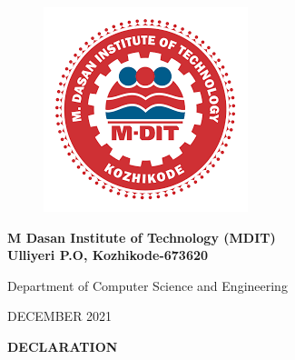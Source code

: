 \documentclass[12pt]{article}
\begin{document}
\begin{changemargin}{0.5cm}{0.5cm}
\begin{figure}[H]
\begin{center}
\includegraphics[scale=.5]{MDIT}
\end{center} 
\end{figure}
\vspace{0.001cm}
\thispagestyle{empty}
\begin{center}\large \bf{M Dasan Institute of Technology (MDIT) \\
Ulliyeri P.O, Kozhikode-673620} \end{center}
\vspace*{0.001cm}
\begin{center}Department of Computer Science and Engineering \end{center}
\vspace{0.001cm}
\begin{center}DECEMBER 2021\end{center}

\newpage



\vspace*{30px}
\begin{center}\LARGE\bf{DECLARATION}\end{center}


\end{changemargin}
\end{document}
